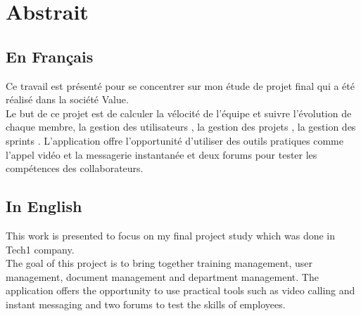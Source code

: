 

\chapter*{Abstrait}
\section*{En Français}
Ce travail est présenté pour se concentrer sur mon étude de projet final qui a été réalisé dans la société Value.\\ 
 Le but de ce projet est de calculer la vélocité de l’équipe et suivre l’évolution de chaque membre, la gestion des utilisateurs , la gestion des projets , la gestion des sprints . L'application offre l'opportunité d'utiliser des outils pratiques comme l'appel vidéo et la messagerie instantanée et deux forums pour tester les compétences des collaborateurs.\\
 
\section*{In English}
  This work is presented to focus on my final project study which was done in Tech1 company.\\
  The goal of this project is to bring together training management, user management, document management and department management. The application offers the opportunity to use practical tools such as video calling and instant messaging and two forums to test the skills of employees.
